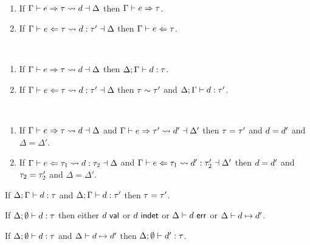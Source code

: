 \begin{theorem} ~
  \begin{enumerate}
    \item If $\Gamma \vdash e \Rightarrow \tau \leadsto d \dashv \Delta$ then $\Gamma \vdash e \Rightarrow \tau$.
    \item If $\Gamma \vdash e \Leftarrow \tau \leadsto d : \tau' \dashv \Delta$ then $\Gamma \vdash e \Leftarrow \tau$.
  \end{enumerate}
\end{theorem}

\begin{theorem} ~
  \begin{enumerate}
    \item If $\Gamma \vdash e \Rightarrow \tau \leadsto d \dashv \Delta$ then $\Delta; \Gamma \vdash d : \tau$.
    \item If $\Gamma \vdash e \Leftarrow \tau \leadsto d : \tau' \dashv \Delta$ then $\tau \sim \tau'$ and $\Delta; \Gamma \vdash d : \tau'$.
  \end{enumerate}
\end{theorem}

\begin{theorem} ~
  \begin{enumerate}
    \item If $\Gamma \vdash e \Rightarrow \tau \leadsto d \dashv \Delta$ and $\Gamma \vdash e \Rightarrow \tau' \leadsto d' \dashv \Delta'$ then $\tau=\tau'$ and $d=d'$ and $\Delta=\Delta'$.
    \item If $\Gamma \vdash e \Leftarrow \tau_1 \leadsto d : \tau_2 \dashv \Delta$ and $\Gamma \vdash e \Leftarrow \tau_1 \leadsto d' : \tau_2' \dashv \Delta'$ then $d=d'$ and $\tau_2=\tau_2'$ and $\Delta=\Delta'$.
  \end{enumerate}
\end{theorem}

\begin{theorem}
If $\Delta; \Gamma \vdash d : \tau$ and $\Delta; \Gamma \vdash d : \tau'$ then $\tau=\tau'$.
\end{theorem}

\begin{theorem}[Progress]
If $\Delta; \emptyset \vdash d : \tau$ then either $d~\mathsf{val}$ or $d~\mathsf{indet}$ or $\Delta \vdash d~\mathsf{err}$ or $\Delta \vdash d \mapsto d'$.
\end{theorem}

\begin{theorem}[Preservation]
  If $\Delta; \emptyset \vdash d : \tau$ and $\Delta \vdash d \mapsto d'$ then $\Delta; \emptyset \vdash d' : \tau$. 
\end{theorem}



